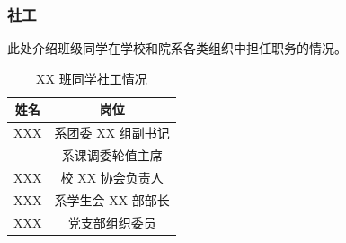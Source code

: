 \subsubsection{社工}

此处介绍班级同学在学校和院系各类组织中担任职务的情况。

\begin{table}[H]
    \centering
    \begin{tabular}{||c|c||}
        \hline
        \hline
        姓名   & 岗位                       \\
        \hline
        XXX & 系团委 XX 组副书记         \\
            & 系课调委轮值主席           \\
        \hline
        XXX & 校 XX 协会负责人           \\
        \hline
        XXX & 系学生会 XX 部部长         \\
        \hline
        XXX & 党支部组织委员             \\
        \hline
        \hline
    \end{tabular}
    \caption{XX 班同学社工情况}
\end{table}
